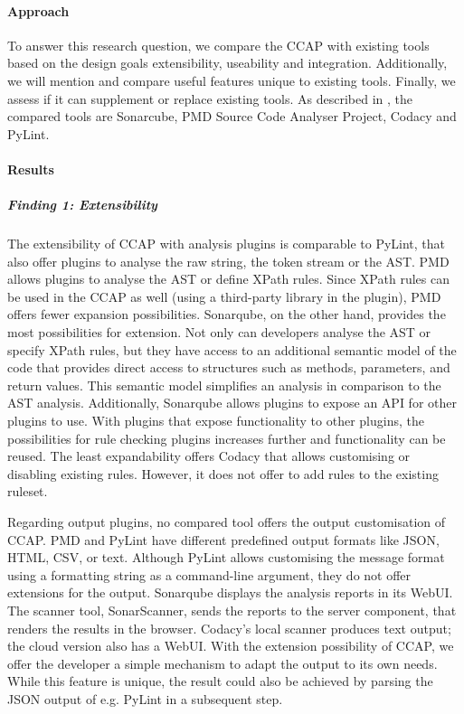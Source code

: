 \paragraph{Approach}
To answer this research question, we compare the CCAP with existing tools based on the design goals extensibility, useability and integration. Additionally, we will mention and compare useful features unique to existing tools. Finally, we assess if it can supplement or replace existing tools. As described in , the compared tools are Sonarcube, PMD Source Code Analyser Project, Codacy and PyLint.

\paragraph{Results}

\subparagraph{Finding 1: Extensibility}
The extensibility of CCAP with analysis plugins is comparable to PyLint, that also offer plugins to analyse the raw string, the token stream or the AST. PMD allows plugins to analyse the AST or define XPath rules. Since XPath rules can be used in the CCAP as well (using a third-party library in the plugin), PMD offers fewer expansion possibilities. Sonarqube, on the other hand, provides the most possibilities for extension. Not only can developers analyse the AST or specify XPath rules, but they have access to an additional semantic model of the code that provides direct access to structures such as methods, parameters, and return values. This semantic model simplifies an analysis in comparison to the AST analysis.
Additionally, Sonarqube allows plugins to expose an API for other plugins to use. With plugins that expose functionality to other plugins, the possibilities for rule checking plugins increases further and functionality can be reused. The least expandability offers Codacy that allows customising or disabling existing rules. However, it does not offer to add rules to the existing ruleset.

Regarding output plugins, no compared tool offers the output customisation of CCAP. PMD and PyLint have different predefined output formats like JSON, HTML, CSV, or text. Although PyLint allows customising the message format using a formatting string as a command-line argument, they do not offer extensions for the output. Sonarqube displays the analysis reports in its WebUI. The scanner tool, SonarScanner, sends the reports to the server component, that renders the results in the browser. Codacy's local scanner produces text output; the cloud version also has a WebUI. 
With the extension possibility of CCAP, we offer the developer a simple mechanism to adapt the output to its own needs. While this feature is unique, the result could also be achieved by parsing the JSON output of e.g. PyLint in a subsequent step.

